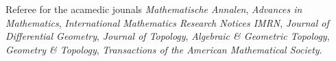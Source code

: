 
\begin{normalsize}
	Referee for the acamedic jounals \textit{Mathematische Annalen}, \textit{Advances in Mathematics}, \textit{International Mathematics Research Notices IMRN}, \textit{Journal of Differential Geometry}, \textit{Journal of Topology}, \textit{Algebraic \& Geometric Topology}, \textit{Geometry \& Topology}, \textit{Transactions of the American Mathematical Society}.
\end{normalsize}
%


